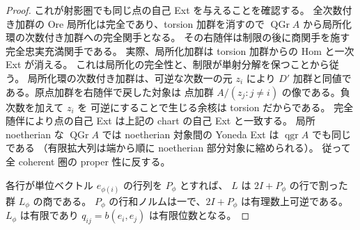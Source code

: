 \begin{proof}
これが射影圏でも同じ点の自己 Ext を与えることを確認する。
全次数付き加群の Ore 局所化は完全であり、torsion 加群を消すので
$\operatorname{QGr} A$ から局所化環の次数付き加群への完全関手となる。
その右随伴は制限の後に商関手を施す完全忠実充満関手である。
実際、局所化加群は torsion 加群からの Hom と一次 Ext が消える。
これは局所化の完全性と、制限が単射分解を保つことから従う。
局所化環の次数付き加群は、可逆な次数一の元 $z_i$ により
$D'$ 加群と同値である。原点加群を右随伴で戻した対象は
点加群 $A/(z_j:j\ne i)$ の像である。負次数を加えて $z_i$ を
可逆にすることで生じる余核は torsion だからである。
完全随伴により点の自己 Ext は上記の chart の自己 Ext と一致する。
局所 noetherian な $\operatorname{QGr} A$ では noetherian 対象間の
Yoneda Ext は $\operatorname{qgr} A$ でも同じである
（有限拡大列は端から順に noetherian 部分対象に縮められる）。
従って全 coherent 圏の proper 性に反する。

各行が単位ベクトル $e_{\phi(i)}$ の行列を $P_\phi$ とすれば、
$L$ は $2I+P_\phi$ の行で割った群 $L_\phi$ の商である。
$P_\phi$ の行和ノルムは一で、$2I+P_\phi$ は有理数上可逆である。
$L_\phi$ は有限であり $q_{ij}=b(e_i,e_j)$ は有限位数となる。
\end{proof}

